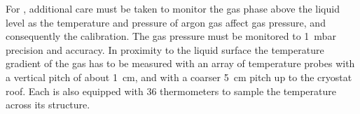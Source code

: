 

For \dual, additional care must be taken to monitor the gas phase above the liquid level as the temperature and pressure of argon gas affect gas pressure, and consequently the  calibration.  The gas pressure must be monitored to \SI{1}{mbar} precision and accuracy. In proximity to the liquid surface the temperature gradient of the  gas has to be measured with an array of temperature probes with a vertical pitch of about \SI{1}{cm}, and with a coarser \SI{5}{cm} pitch up to the cryostat roof. Each  is also equipped with \num{36} thermometers to sample the temperature across its structure.

